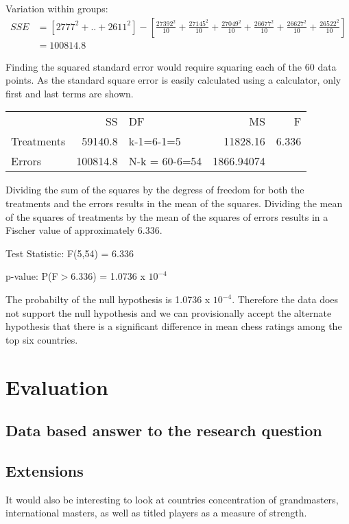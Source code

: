 \documentclass[12pt]{article}
\begin{document}
Variation within groups:
\begin{equation}
\begin{split}
    SSE & = [2777^{2} + .. + 2611^{2}] - [\frac{27392^{2}}{10} + \frac{27145^{2}}{10} + \frac{27049^{2}}{10} + \frac{26677^{2}}{10} + \frac{26627^{2}}{10} + \frac{26522^{2}}{10}] \\
    & = 100814.8 
\end{split}
\end{equation}

Finding the squared standard error would require squaring each of the 60 data points. As the standard square error is easily calculated using a calculator, only first and last terms are shown.

\begin{center}
\begin{tabular}{lrlrr}
 & SS & DF & MS & F\\
Treatments & 59140.8 & k-1=6-1=5 & 11828.16 & 6.336\\
Errors & 100814.8 & N-k = 60-6=54 & 1866.94074 & \\
\end{tabular}
\end{center}
Dividing the sum of the squares by the degress of freedom for both the treatments and the errors results in the mean of the squares. Dividing the mean of the squares of treatments by the mean of the squares of errors results in a Fischer value of approximately 6.336.

Test Statistic: F(5,54) = 6.336

p-value: P(F\(>\)6.336) = 1.0736 x \(10^{-4}\)

The probabilty of the null hypothesis is 1.0736 x \(10^{-4}\). Therefore the data does not support the null hypothesis and we can provisionally accept the alternate hypothesis that there is a significant difference in mean chess ratings among the top six countries.

\section{Evaluation}
\subsection{Data based answer to the research question}
\subsection{Extensions}
It would also be interesting to look at countries concentration of grandmasters, international masters, as well as titled players as a measure of strength. 
\end{document}
